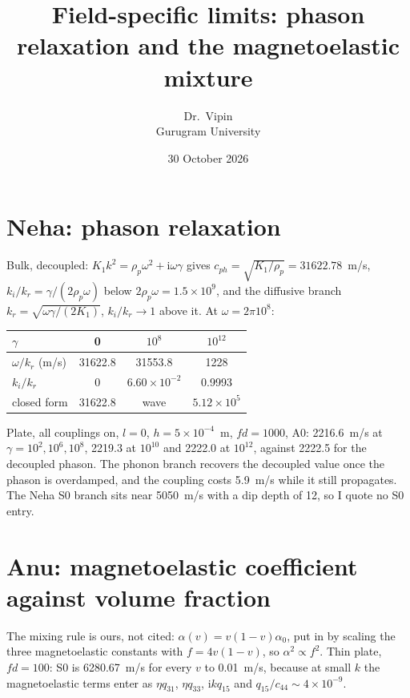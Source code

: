 \documentclass[11pt,a4paper]{article}
\title{\vspace{-1.6cm}\Large Field-specific limits: phason relaxation and the magnetoelastic mixture}
\author{Dr.\ Vipin\\ Gurugram University}
\date{30 October 2026}
\begin{document}
\maketitle
\vspace{-6mm}

\section*{Neha: phason relaxation}

Bulk, decoupled: $K_1k^{2}=\rho_p\omega^{2}+\mathrm{i}\omega\gamma$ gives
$c_{ph}=\sqrt{K_1/\rho_p}=31622.78$~m/s, $k_i/k_r=\gamma/(2\rho_p\omega)$ below
$2\rho_p\omega=1.5\times10^{9}$, and the diffusive branch $k_r=\sqrt{\omega\gamma/(2K_1)}$,
$k_i/k_r\to1$ above it. At $\omega=2\pi10^{8}$:

\begin{center}\footnotesize
\begin{tabular}{lccc}
\toprule
$\gamma$ & 0 & $10^{8}$ & $10^{12}$\\
\midrule
$\omega/k_r$ (m/s) & 31622.8 & 31553.8 & 1228\\
$k_i/k_r$ & 0 & $6.60\times10^{-2}$ & 0.9993\\
closed form & 31622.8 & wave & $5.12\times10^{5}$\\
\bottomrule
\end{tabular}
\end{center}

Plate, all couplings on, $l=0$, $h=5\times10^{-4}$~m, $fd=1000$, A0: 2216.6~m/s at
$\gamma=10^{2},10^{6},10^{8}$, 2219.3 at $10^{10}$ and 2222.0 at $10^{12}$, against 2222.5 for the
decoupled phason. The phonon branch recovers the decoupled value once the phason is overdamped, and
the coupling costs 5.9~m/s while it still propagates. The Neha S0 branch sits near 5050~m/s with a
dip depth of 12, so I quote no S0 entry.

\section*{Anu: magnetoelastic coefficient against volume fraction}

The mixing rule is ours, not cited: $\alpha(v)=v(1-v)\alpha_0$, put in by scaling the three
magnetoelastic constants with $f=4v(1-v)$, so $\alpha^{2}\propto f^{2}$. Thin plate, $fd=100$: S0 is
6280.67~m/s for every $v$ to 0.01~m/s, because at small $k$ the magnetoelastic terms enter as
$\eta q_{31}$, $\eta q_{33}$, $\mathrm{i}kq_{15}$ and $q_{15}/c_{44}\sim4\times10^{-9}$.
\end{document}
